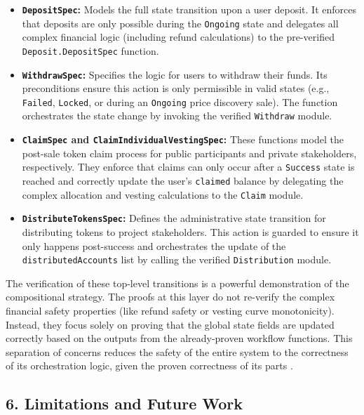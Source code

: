 \documentclass[
  english,
  onecolumn]{article}
\providecommand{\tightlist}{%
  \setlength{\itemsep}{0pt}\setlength{\parskip}{0pt}}
\begin{document}
\begin{itemize}
\tightlist
\item
  \textbf{\texttt{DepositSpec}:} Models the full state transition upon a
  user deposit. It enforces that deposits are only possible during the
  \texttt{Ongoing} state and delegates all complex financial logic
  (including refund calculations) to the pre-verified
  \texttt{Deposit.DepositSpec} function.
\item
  \textbf{\texttt{WithdrawSpec}:} Specifies the logic for users to
  withdraw their funds. Its preconditions ensure this action is only
  permissible in valid states (e.g., \texttt{Failed}, \texttt{Locked},
  or during an \texttt{Ongoing} price discovery sale). The function
  orchestrates the state change by invoking the verified
  \texttt{Withdraw} module.
\item
  \textbf{\texttt{ClaimSpec} and \texttt{ClaimIndividualVestingSpec}:}
  These functions model the post-sale token claim process for public
  participants and private stakeholders, respectively. They enforce that
  claims can only occur after a \texttt{Success} state is reached and
  correctly update the user's \texttt{claimed} balance by delegating the
  complex allocation and vesting calculations to the \texttt{Claim}
  module.
\item
  \textbf{\texttt{DistributeTokensSpec}:} Defines the administrative
  state transition for distributing tokens to project stakeholders. This
  action is guarded to ensure it only happens post-success and
  orchestrates the update of the \texttt{distributedAccounts} list by
  calling the verified \texttt{Distribution} module.
\end{itemize}

The verification of these top-level transitions is a powerful
demonstration of the compositional strategy. The proofs at this layer do
not re-verify the complex financial safety properties (like refund
safety or vesting curve monotonicity). Instead, they focus solely on
proving that the global state fields are updated correctly based on the
outputs from the already-proven workflow functions. This separation of
concerns reduces the safety of the entire system to the correctness of
its orchestration logic, given the proven correctness of its parts
.

\subsection{6. Limitations and Future
Work}\label{limitations-and-future-work}
\end{document}
